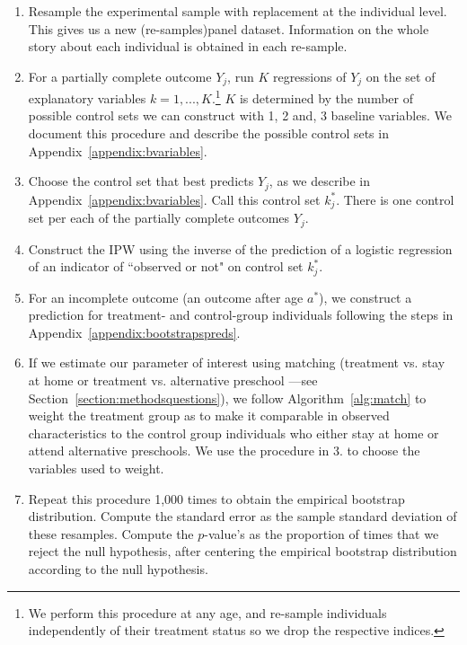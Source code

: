 \begin{enumerate}

\item Resample the experimental sample with replacement at the individual level. This gives us a new (re-samples)panel dataset. Information on the whole story about each individual is obtained in each re-sample.

\item For a partially complete outcome $Y_{j}$, run $K$ regressions of $Y_{j}$ on the set of explanatory variables $k = 1,..., K$.\footnote{We perform this procedure at any age, and re-sample individuals independently of their treatment status so we drop the respective indices.} $K$ is determined by the number of possible control sets we can construct with 1, 2 and, 3 baseline variables. We document this procedure and describe the possible control sets in Appendix~\ref{appendix:bvariables}.

\item Choose the control set that best predicts $Y_{j}$, as we describe in Appendix~\ref{appendix:bvariables}. Call this control set $k^*_{j}$. There is one control set per each of the partially complete outcomes $Y_{j}$.

\item Construct the IPW using the inverse of the prediction of  a logistic regression of an indicator of ``observed or not" on control set $k^*_{j}$.

\item For an incomplete outcome (an outcome after age $a^*$), we construct a prediction for treatment- and control-group individuals following the steps in Appendix~\ref{appendix:bootstrapspreds}.

\item If we estimate our parameter of interest using  matching (treatment vs. stay at home or treatment vs. alternative preschool ---see Section~\ref{section:methodsquestions}), we follow Algorithm~\ref{alg:match} to weight the treatment group as to make it comparable in observed characteristics to the control group individuals who either stay at home or attend alternative preschools. We use the procedure in 3. to choose the variables used to weight.

\item Repeat this procedure 1,000 times to obtain the empirical bootstrap distribution. Compute the standard error as the sample standard deviation of these resamples. Compute the $p$-value's as the proportion of times that we reject the null hypothesis, after centering the empirical bootstrap distribution according to the null hypothesis.

\end{enumerate}

